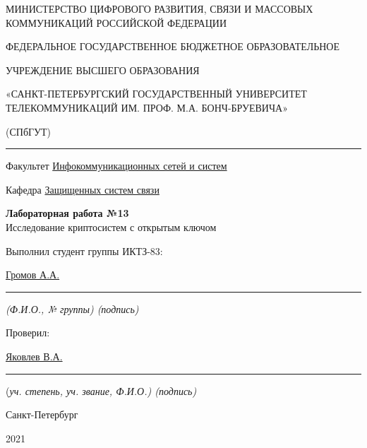 \documentclass[a4paper,14pt]{extarticle}
\begin{document}
    \begin{center}
        \thispagestyle{empty}
        \begin{singlespace}
        МИНИСТЕРСТВО ЦИФРОВОГО РАЗВИТИЯ, СВЯЗИ И МАССОВЫХ КОММУНИКАЦИЙ РОССИЙСКОЙ ФЕДЕРАЦИИ

        ФЕДЕРАЛЬНОЕ ГОСУДАРСТВЕННОЕ БЮДЖЕТНОЕ ОБРАЗОВАТЕЛЬНОЕ

        УЧРЕЖДЕНИЕ ВЫСШЕГО ОБРАЗОВАНИЯ

        «САНКТ-ПЕТЕРБУРГСКИЙ ГОСУДАРСТВЕННЫЙ УНИВЕРСИТЕТ ТЕЛЕКОММУНИКАЦИЙ ИМ. ПРОФ. М.А. БОНЧ-БРУЕВИЧА»

        (СПбГУТ)
        \end{singlespace}
        \vspace{-1ex}
        \rule{\textwidth}{0.4pt}
        \vspace{-5ex}

        Факультет \underline{Инфокоммуникационных сетей и систем}

        Кафедра \underline{Защищенных систем связи}
        \vspace{10ex}

        \textbf{Лабораторная работа №13}\\
        Исследование криптосистем с открытым ключом


    \end{center}
    \vspace{4ex}
    \begin{flushright}
    \parbox{10 cm}{
    \begin{flushleft}
        Выполнил студент группы ИКТЗ-83:

        \underline{Громов А.А. } \hfill \rule[-0.85ex]{0.1\textwidth}{0.6pt}

        \footnotesize \textit{ (Ф.И.О., № группы) \hfill (подпись)} \normalsize

        Проверил:

        \underline{Яковлев В.А.} \hfill \rule[-0.85ex]{0.1\textwidth}{0.6pt}

        (\footnotesize \textit{уч. степень, уч. звание, Ф.И.О.) \hfill (подпись)} \normalsize

    \end{flushleft}
    }
    \end{flushright}
    \begin{center}
        \vfill
        Санкт-Петербург

        2021

    \end{center}
    \newpage
\end{document}
